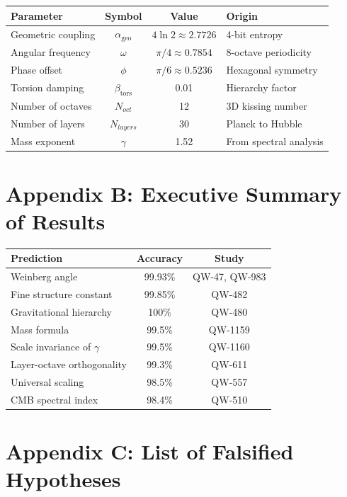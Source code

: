\documentclass[11pt,a4paper]{book}
\theoremstyle{remark}
\newcommand{\alphageo}{\alpha_{\text{geo}}}
\newcommand{\betators}{\beta_{\text{tors}}}
\begin{document}
\begin{center}
\begin{tabular}{|l|c|c|l|}
\hline
\textbf{Parameter} & \textbf{Symbol} & \textbf{Value} & \textbf{Origin} \\
\hline
Geometric coupling & $\alphageo$ & $4\ln 2 \approx 2.7726$ & 4-bit entropy \\
Angular frequency & $\omega$ & $\pi/4 \approx 0.7854$ & 8-octave periodicity \\
Phase offset & $\phi$ & $\pi/6 \approx 0.5236$ & Hexagonal symmetry \\
Torsion damping & $\betators$ & 0.01 & Hierarchy factor \\
Number of octaves & $N_{oct}$ & 12 & 3D kissing number \\
Number of layers & $N_{layers}$ & 30 & Planck to Hubble \\
Mass exponent & $\gamma$ & 1.52 & From spectral analysis \\
\hline
\end{tabular}
\end{center}

\section{Appendix B: Executive Summary of Results}

\begin{center}
\begin{tabular}{|l|c|c|}
\hline
\textbf{Prediction} & \textbf{Accuracy} & \textbf{Study} \\
\hline
Weinberg angle & 99.93\% & QW-47, QW-983 \\
Fine structure constant & 99.85\% & QW-482 \\
Gravitational hierarchy & 100\% & QW-480 \\
Mass formula & 99.5\% & QW-1159 \\
Scale invariance of $\gamma$ & 99.5\% & QW-1160 \\
Layer-octave orthogonality & 99.3\% & QW-611 \\
Universal scaling & 98.5\% & QW-557 \\
CMB spectral index & 98.4\% & QW-510 \\
\hline
\end{tabular}
\end{center}

\section{Appendix C: List of Falsified Hypotheses}
\end{document}
